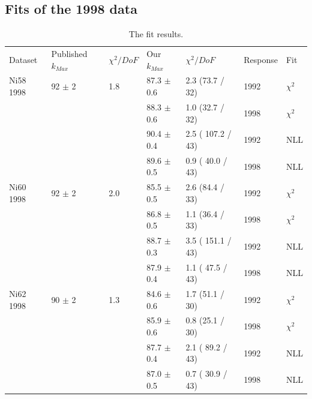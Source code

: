 \subsection { Fits of the 1998 data }
\begin{table}[H]
  \begin{center}
    \begin{tabular}{|l||l|l|l|l|l|l|}
      \hline
      Dataset & Published $k_{Max}$ & $\chi^2 / DoF$ & Our $k_{Max}$ & $\chi^2 / DoF$  & Response & Fit \\
      \hhline{|=||=|=|=|=|=|=|}
       Ni58 1998 & 92   $\pm$ 2   & 1.8 & 87.3 $\pm$ 0.6 &  2.3 (73.7 / 32) & 1992 & $\chi^2$ \\  
                 &                &     & 88.3 $\pm$ 0.6 &  1.0 (32.7 / 32) & 1998 & $\chi^2$ \\  
                                                                             
                &                 &     & 90.4 $\pm$ 0.4 & 2.5 ( 107.2 / 43) & 1992 & NLL \\
                &                 &     & 89.6 $\pm$ 0.5 & 0.9 ( 40.0 / 43) & 1998 & NLL \\
      \hline                                                                 
       Ni60 1998 & 92   $\pm$ 2   & 2.0 & 85.5 $\pm$ 0.5 &  2.6 (84.4 / 33) & 1992 & $\chi^2$ \\  
                 &                &     & 86.8 $\pm$ 0.5 &  1.1 (36.4 / 33) & 1998 & $\chi^2$ \\  
                                                                             
                &                 &     & 88.7 $\pm$ 0.3 & 3.5 ( 151.1 / 43) & 1992 & NLL \\
                &                 &     & 87.9 $\pm$ 0.4 & 1.1 ( 47.5 / 43) & 1998 & NLL \\
      \hline                                                                 
       Ni62 1998 & 90   $\pm$ 2   & 1.3 & 84.6 $\pm$ 0.6 &  1.7 (51.1 / 30) & 1992 & $\chi^2$ \\  
                 &                &     & 85.9 $\pm$ 0.6 &  0.8 (25.1 / 30) & 1998 & $\chi^2$ \\  
                                                                             
                &                 &     & 87.7 $\pm$ 0.4 & 2.1 ( 89.2 / 43) & 1992 & NLL \\
                &                 &     & 87.0 $\pm$ 0.5 & 0.7 ( 30.9 / 43) & 1998 & NLL \\
      \hline                           
    \end{tabular}
  \end{center}
  \caption{The fit results.}
  \label{table:fits1998}
\end{table}

